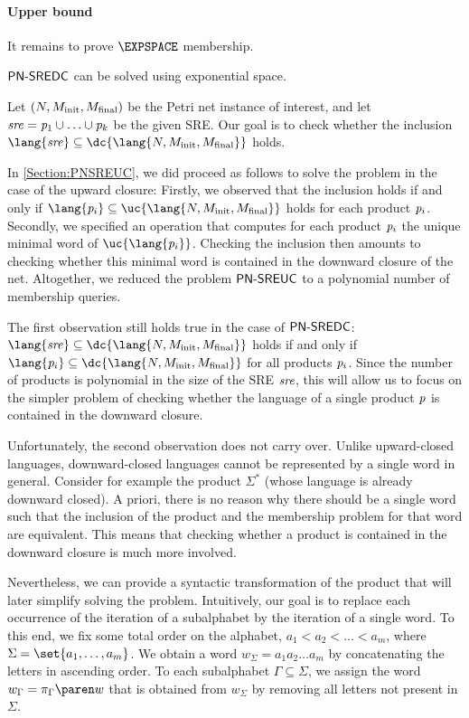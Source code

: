 \documentclass[../../diss.tex]{subfiles}
\begin{document}
\paragraph{Upper bound}

It remains to prove $\EXPSPACE$ membership.

\begin{theorem}%
\label{Theorem:PNSREDCMembership}%
    $\mathsf{PN\text{-}SREDC}$ can be solved using exponential space.
\end{theorem}

Let $(N,M_{\text{init}},M_{\text{final}})$ be the Petri net instance of interest, and let $\mathit{sre} = \mathit{p}_1 \cup \ldots \cup \mathit{p}_k$ be the given SRE.\@
Our goal is to check whether the inclusion $\lang{\sre} \subseteq \dc{\lang{N,\Minit,\Mfinal}}$ holds.

In \cref{Section:PNSREUC}, we did proceed as follows to solve the problem in the case of the upward closure:
Firstly, we observed that the inclusion holds if and only if $\lang{\product_i} \subseteq \uc{\lang{N,\Minit,\Mfinal}}$ holds for each product $\mathit{p}_i$.
Secondly, we specified an operation that computes for each product $\mathit{p}_i$ the unique minimal word of $\uc{\lang{\product_i}}$.
Checking the inclusion then amounts to checking whether this minimal word is contained in the downward closure of the net.
Altogether, we reduced the problem $\mathsf{PN\text{-}SREUC}$ to a polynomial number of membership queries.

The first observation still holds true in the case of $\mathsf{PN\text{-}SREDC}$:  $\lang{\sre} \subseteq \dc{\lang{N,\Minit,\Mfinal}}$ holds if and only if $\lang{\product_i} \subseteq \dc{\lang{N,\Minit,\Mfinal}}$ for all products $\mathit{p}_i$.
Since the number of products is polynomial in the size of the SRE $\mathit{sre}$, this will allow us to focus on the simpler problem of checking whether the language of a single product $\mathit{p}$ is contained in the downward closure.

Unfortunately, the second observation does not carry over.
Unlike upward-closed languages, downward-closed languages cannot be represented by a single word in general.
Consider for example the product $\Sigma^*$ (whose language is already downward closed).
A priori, there is no reason why there should be a single word such that the inclusion of the product and the membership problem for that word are equivalent.
This means that checking whether a product is contained in the downward closure is much more involved.

Nevertheless, we can provide a syntactic transformation of the product that will later simplify solving the problem.
Intuitively, our goal is to replace each occurrence of the iteration of a subalphabet by the iteration of a single word.
To this end, we fix some total order on the alphabet, \eg $a_1 < a_2 < \ldots < a_m$, where $\Sigma = \set{a_1, \ldots, a_m}$.
We obtain a word $w_\Sigma = a_1 a_2 \ldots a_m$ by concatenating the letters in ascending order.
To each subalphabet $\Gamma \subseteq \Sigma$, we assign the word $w_\Gamma = \proj{\Gamma}{w}$ that is obtained from $w_\Sigma$ by removing all letters not present in $\Sigma$.
\end{document}
